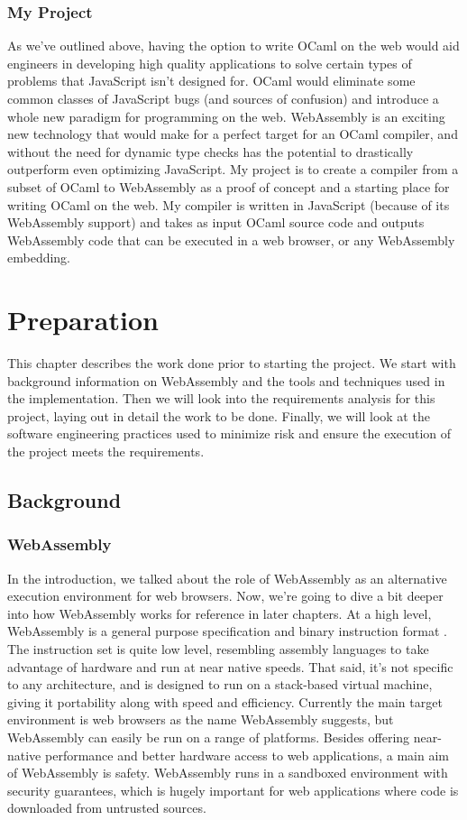 \documentclass[12pt,a4paper,twoside,openright]{report}
\begin{document}
\subsection{My Project}

As we've outlined above, having the option to write OCaml on the web would aid engineers in developing high quality applications to solve certain types of problems that JavaScript isn't designed for.
OCaml would eliminate some common classes of JavaScript bugs (and sources of confusion) and introduce a whole new paradigm for programming on the web.
WebAssembly is an exciting new technology that would make for a perfect target for an OCaml compiler, and without the need for dynamic type checks has the potential to drastically outperform even optimizing JavaScript.
My project is to create a compiler from a subset of OCaml to WebAssembly as a proof of concept and a starting place for writing OCaml on the web.
My compiler is written in JavaScript (because of its WebAssembly support) and takes as input OCaml source code and outputs WebAssembly code that can be executed in a web browser, or any WebAssembly embedding.

\chapter{Preparation}

This chapter describes the work done prior to starting the project.
We start with background information on WebAssembly and the tools and techniques used in the implementation.
Then we will look into the requirements analysis for this project, laying out in detail the work to be done.
Finally, we will look at the software engineering practices used to minimize risk and ensure the execution of the project meets the requirements.

\section{Background}
\subsection{WebAssembly}

In the introduction, we talked about the role of WebAssembly as an alternative execution environment for web browsers.
Now, we're going to dive a bit deeper into how WebAssembly works for reference in later chapters.
At a high level, WebAssembly is a general purpose specification and binary instruction format \cite{mozillawasm}.
The instruction set is quite low level, resembling assembly languages to take advantage of hardware and run at near native speeds.
That said, it's not specific to any architecture, and is designed to run on a stack-based virtual machine, giving it portability along with speed and efficiency.
Currently the main target environment is web browsers as the name WebAssembly suggests, but WebAssembly can easily be run on a range of platforms.
Besides offering near-native performance and better hardware access to web applications, a main aim of WebAssembly is safety.
WebAssembly runs in a sandboxed environment with security guarantees, which is hugely important for web applications where code is downloaded from untrusted sources.
\end{document}
